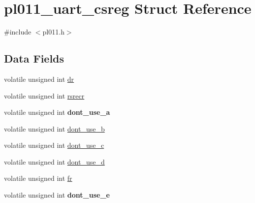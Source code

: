 \hypertarget{structpl011__uart__csreg}{\section{pl011\-\_\-uart\-\_\-csreg Struct Reference}
\label{structpl011__uart__csreg}
}


{\ttfamily \#include $<$pl011.\-h$>$}

\subsection*{Data Fields}
\begin{DoxyCompactItemize}
\item 
volatile unsigned int \hyperlink{structpl011__uart__csreg_a4c66e8d8a321655827c55f283e2f0c5f}{dr}
\item 
volatile unsigned int \hyperlink{structpl011__uart__csreg_a17ec77f318b87b8f7563508245e18438}{rsrecr}
\item 
\hypertarget{structpl011__uart__csreg_ae69e254f74b6e237ca6f8151e8b6ee90}{volatile unsigned int {\bfseries dont\-\_\-use\-\_\-a}}\label{structpl011__uart__csreg_ae69e254f74b6e237ca6f8151e8b6ee90}

\item 
volatile unsigned int \hyperlink{structpl011__uart__csreg_aa55af5642e87a291a7fcdbf78a4622a9}{dont\-\_\-use\-\_\-b}
\item 
volatile unsigned int \hyperlink{structpl011__uart__csreg_ae1386f62227dd11aabd9706a6def488f}{dont\-\_\-use\-\_\-c}
\item 
volatile unsigned int \hyperlink{structpl011__uart__csreg_a32675cf6ee70fbe72947432343edf1d9}{dont\-\_\-use\-\_\-d}
\item 
volatile unsigned int \hyperlink{structpl011__uart__csreg_a2592e71e079472be14149f24be0e7a42}{fr}
\item 
\hypertarget{structpl011__uart__csreg_a62b7a70340fe4565780b19ad514f105f}{volatile unsigned int {\bfseries dont\-\_\-use\-\_\-e}}\label{structpl011__uart__csreg_a62b7a70340fe4565780b19ad514f105f}


\end{DoxyCompactItemize}
